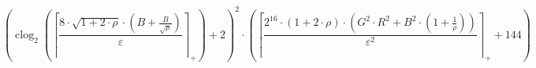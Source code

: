 \[\left(\operatorname{clog}_{2}\left(\left\lceil \frac{8 \cdot \sqrt{1 + 2 \cdot \rho} \cdot \left(B + \frac{B}{\sqrt{\rho}}\right)}{\varepsilon} \right\rceil_{+}\right) + 2\right)^{2} \cdot \left(\left\lceil \frac{2^{16} \cdot \left(1 + 2 \cdot \rho\right) \cdot \left(G^{2} \cdot R^{2} + B^{2} \cdot \left(1 + \frac{1}{\rho}\right)\right)}{\varepsilon^{2}} \right\rceil_{+} + 144\right)\]
